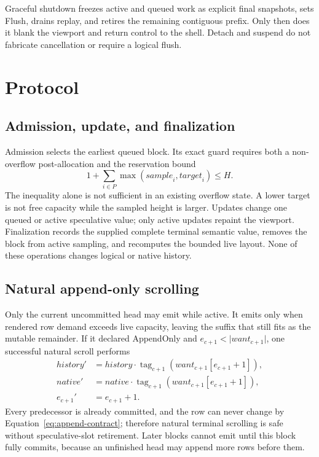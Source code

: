 \documentclass[11pt]{article}
\theoremstyle{definition}
\newcommand{\len}[1]{\lvert #1\rvert}
\newcommand{\cat}{\mathbin{\cdot}}
\newcommand{\History}{\mathit{history}}
\newcommand{\Native}{\mathit{native}}
\newcommand{\Want}{\mathit{want}}
\newcommand{\alloc}{\mathit{sample}}
\newcommand{\target}{\mathit{target}}
\begin{document}
Graceful shutdown freezes active and queued work as explicit final snapshots,
sets \textsf{Flush}, drains replay, and retires the remaining contiguous
prefix.  Only then does it blank the viewport and return control to the shell.
Detach and suspend do not fabricate cancellation or require a logical flush.

\section{Protocol}
\label{sec:protocol}

\subsection{Admission, update, and finalization}

Admission selects the earliest queued block.  Its exact guard requires both a
non-overflow post-allocation and the reservation bound
\[
  1+\sum_{i\in P}\max(\alloc_i,\target_i)\leq H.
\]
The inequality alone is not sufficient in an existing overflow state.  A lower
target is not free capacity while the sampled height is larger.
Updates change one queued or active speculative value; only active updates
repaint the viewport.  Finalization records the supplied complete terminal
semantic value, removes the block from active sampling,
and recomputes the bounded live layout.  None of these operations changes
logical or native history.

\subsection{Natural append-only scrolling}

Only the current uncommitted head may emit while active.  It emits only when
rendered row demand exceeds live capacity, leaving the suffix that still fits
as the mutable remainder.  If it declared AppendOnly and
$e_{c+1}<\len{\Want_{c+1}}$, one successful natural scroll performs
\begin{align*}
  \History'&=\History\cat
    \operatorname{tag}_{c+1}(\Want_{c+1}[e_{c+1}+1]),\\
  \Native'&=\Native\cat
    \operatorname{tag}_{c+1}(\Want_{c+1}[e_{c+1}+1]),\\
  e_{c+1}'&=e_{c+1}+1.
\end{align*}
Every predecessor is already committed, and the row can never change by
Equation~\eqref{eq:append-contract}; therefore natural terminal scrolling is
safe without speculative-slot retirement.  Later blocks cannot emit until
this block fully commits, because an unfinished head may append more rows
before them.
\end{document}
